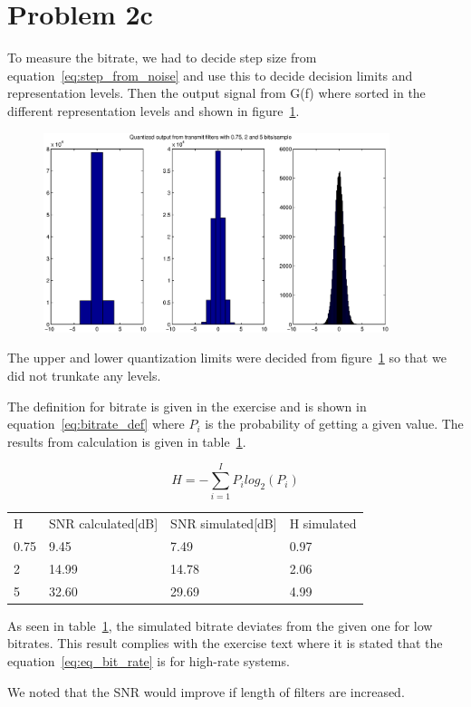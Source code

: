 \section{Problem 2c}
	
	To measure the bitrate, we had to decide step size from equation~\ref{eq:step_from_noise} and use this to decide decision limits and representation levels. Then the output signal from G(f) where sorted in the different representation levels and shown in figure~\ref{fig:Quant_output}.
	
	\begin{figure}[H]
		\centering
		\includegraphics[width=0.9\textwidth]{img/Oppgave2c_Quant_output}
		\label{fig:Quant_output}
	\end{figure}
	The upper and lower quantization limits were decided from figure~\ref{fig:Quant_output} so that we did not trunkate any levels. 
	
	The definition for bitrate is given in the exercise and is shown in equation~\ref{eq:bitrate_def} where $P_i$ is the probability of getting a given value. The results from calculation is given in table~\ref{tab:result_SNR_H}.
	
	\begin{equation}
		H=-\sum\limits_{i=1}^{I}P_ilog_2(P_i)
		\label{eq:bitrate_def}            
	\end{equation}
	
	\begin{table}[H]
		\centering
		\begin{tabular}{l l l l}
			H & SNR calculated[dB] & SNR simulated[dB] & H simulated\\
			0.75 & 9.45 & 7.49 & 0.97 \\
			2 & 14.99 & 14.78 & 2.06\\
			5 & 32.60 & 29.69 & 4.99\\
		\end{tabular}
		\label{tab:result_SNR_H}
	\end{table}
	
	As seen in table~\ref{tab:result_SNR_H}, the simulated bitrate deviates from the given one for low bitrates. This result complies with the exercise text where it is stated that the equation~\ref{eq:eq_bit_rate} is for high-rate systems. 
	
	We noted that the SNR would improve if length of filters are increased.